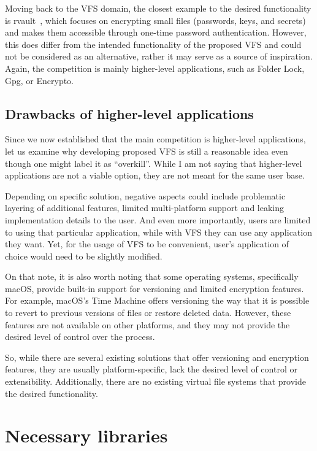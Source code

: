Moving back to the VFS domain, the closest example to the desired functionality is rvault~\cite{rvault}, which focuses on encrypting small files (passwords, keys, and secrets) and makes them accessible through one-time password authentication.
However, this does differ from the intended functionality of the proposed VFS and could not be considered as an alternative, rather it may serve as a source of inspiration.
Again, the competition is mainly higher-level applications, such as Folder Lock, Gpg, or Encrypto.

\subsection{Drawbacks of higher-level applications}\label{subsec:drawbacks-of-higher-level-applications}

Since we now established that the main competition is higher-level applications, let us examine why developing proposed VFS is still a reasonable idea even though one might label it as ``overkill''.
While I am not saying that higher-level applications are not a viable option, they are not meant for the same user base.

Depending on specific solution, negative aspects could include problematic layering of additional features, limited multi-platform support and leaking implementation details to the user.
And even more importantly, users are limited to using that particular application, while with VFS they can use any application they want.
Yet, for the usage of VFS to be convenient, user's application of choice would need to be slightly modified.

On that note, it is also worth noting that some operating systems, specifically macOS, provide built-in support for versioning and limited encryption features.
For example, macOS's Time Machine offers versioning the way that it is possible to revert to previous versions of files or restore deleted data.
However, these features are not available on other platforms, and they may not provide the desired level of control over the process.

So, while there are several existing solutions that offer versioning and encryption features, they are usually platform-specific, lack the desired level of control or extensibility.
Additionally, there are no existing virtual file systems that provide the desired functionality.


\section{Necessary libraries}\label{sec:libs}

